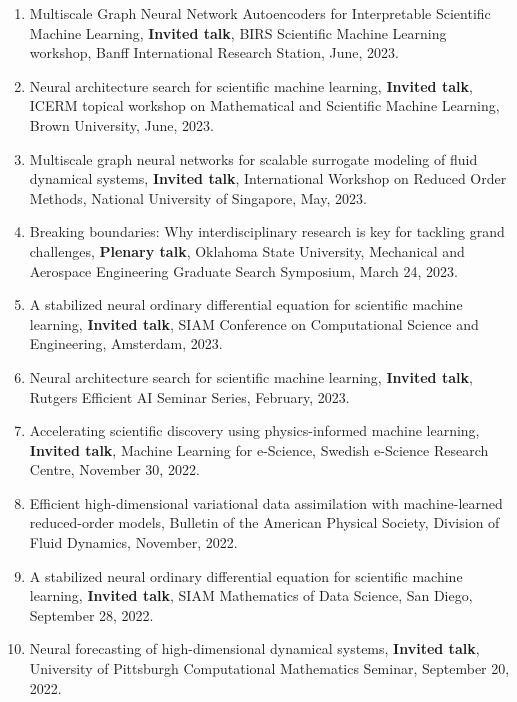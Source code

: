 \documentclass[letterpaper]{article}
\begin{document}
\begin{enumerate}
\item Multiscale Graph Neural Network Autoencoders for Interpretable Scientific Machine Learning, \textbf{Invited talk}, BIRS Scientific Machine Learning workshop, Banff International Research Station, June, 2023.

\item Neural architecture search for scientific machine learning, \textbf{Invited talk}, ICERM topical workshop on Mathematical and Scientific Machine Learning, Brown University, June, 2023.

\item Multiscale graph neural networks for scalable surrogate modeling of fluid dynamical systems, \textbf{Invited talk}, International Workshop on Reduced Order Methods, National University of Singapore, May, 2023.

\item Breaking boundaries: Why interdisciplinary research is key for tackling grand challenges, \textbf{Plenary talk}, Oklahoma State University, Mechanical and Aerospace Engineering Graduate Search Symposium, March 24, 2023.

\item A stabilized neural ordinary differential equation for scientific machine learning, \textbf{Invited talk}, SIAM Conference on Computational Science and Engineering, Amsterdam, 2023.

\item Neural architecture search for scientific machine learning, \textbf{Invited talk}, Rutgers Efficient AI Seminar Series, February, 2023.

\item Accelerating scientific discovery using physics-informed machine learning, \textbf{Invited talk}, Machine Learning for e-Science, Swedish e-Science Research Centre, November 30, 2022.

\item Efficient high-dimensional variational data assimilation with machine-learned reduced-order models, Bulletin of the American Physical Society, Division of Fluid Dynamics, November, 2022.

\item A stabilized neural ordinary differential equation for scientific machine learning, \textbf{Invited talk}, SIAM Mathematics of Data Science, San Diego, September 28, 2022.

\item Neural forecasting of high-dimensional dynamical systems, \textbf{Invited talk}, University of Pittsburgh Computational Mathematics Seminar, September 20, 2022.


\end{enumerate}
\end{document}
